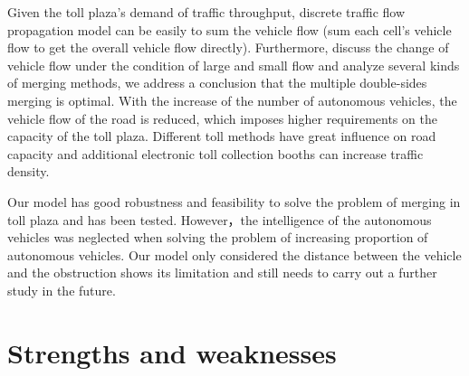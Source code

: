 \documentclass{mcmthesis}
\begin{document}
Given the toll plaza’s demand of traffic throughput, discrete traffic flow propagation model can be easily to sum the vehicle flow (sum each cell’s vehicle flow to get the overall vehicle flow directly). Furthermore, discuss the change of vehicle flow under the condition of large and small flow and analyze several kinds of merging methods, we address a conclusion that the multiple double-sides merging is optimal. With the increase of the number of autonomous vehicles, the vehicle flow of the road is reduced, which imposes higher requirements on the capacity of the toll plaza. Different toll methods have great influence on road capacity and additional electronic toll collection booths can increase traffic density.

Our model has good robustness and feasibility to solve the problem of merging in toll plaza and has been tested. However，the intelligence of the autonomous vehicles was neglected when solving the problem of increasing proportion of autonomous vehicles. Our model only considered the distance between the vehicle and the obstruction shows its limitation and still needs to carry out a further study in the future.
\section{Strengths and weaknesses}
\end{document}
